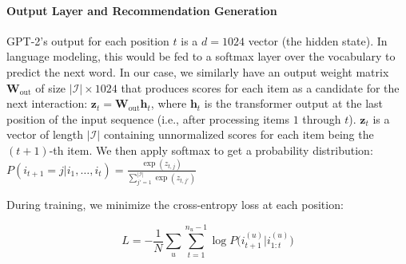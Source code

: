 \documentclass[conference]{IEEEtran}
\begin{document}
\paragraph{Output Layer and Recommendation Generation} GPT-2's output for each position $t$ is a $d=1024$ vector (the hidden state). In language modeling, this would be fed to a softmax layer over the vocabulary to predict the next word. In our case, we similarly have an output weight matrix $\mathbf{W}_{\text{out}}$ of size $|\mathcal{I}|\times 1024$ that produces scores for each item as a candidate for the next interaction: $\mathbf{z}_t = \mathbf{W}_{\text{out}}\mathbf{h}_{t}$, where $\mathbf{h}_t$ is the transformer output at the last position of the input sequence (i.e., after processing items $1$ through $t$). $\mathbf{z}_t$ is a vector of length $|\mathcal{I}|$ containing unnormalized scores for each item being the $(t+1)$-th item. We then apply softmax to get a probability distribution: $P(i_{t+1}=j|i_{1}, \ldots, i_{t}) = \frac{\exp(z_{t,j})}{\sum_{j'=1}^{|\mathcal{I}|}\exp(z_{t,j'})}$

During training, we minimize the cross-entropy loss at each position:

$$L = - \frac{1}{N} \sum_{u} \sum_{t=1}^{n_{u}-1} \log P\big( i_{t+1}^{(u)} \big| i_{1:t}^{(u)} \big)$$
\end{document}
